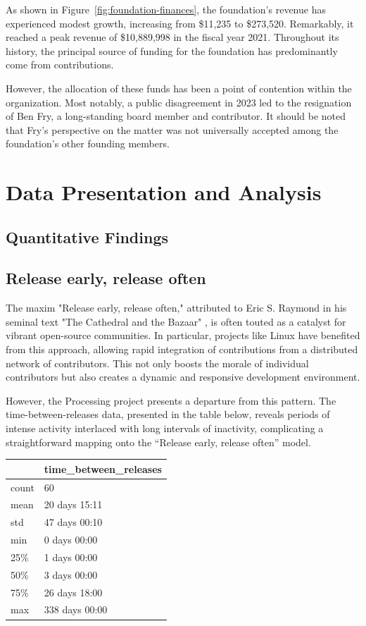\documentclass[draft]{article}
\begin{document}
As shown in Figure~\ref{fig:foundation-finances}, the foundation's revenue has experienced modest growth, increasing from \$11,235 to \$273,520. Remarkably, it reached a peak revenue of \$10,889,998 in the fiscal year 2021. Throughout its history, the principal source of funding for the foundation has predominantly come from contributions. 

However, the allocation of these funds has been a point of contention within the organization. Most notably, a public disagreement in 2023 led to the resignation of Ben Fry, a long-standing board member and contributor. It should be noted that Fry's perspective on the matter was not universally accepted among the foundation's other founding members. \parencite{benfry[@ben_fry]HaveMadeExtremely2023} \parencite{caseyreas[@reas]EarlierThisWeek2023} \parencite{danielshiffman[@shiffman]WouldPostNote2023}

\section{Data Presentation and Analysis}

\subsection{Quantitative Findings}

\subsection{Release early, release often}

The maxim "Release early, release often," attributed to Eric S. Raymond in his seminal text "The Cathedral and the Bazaar" \parencite{raymondCathedralBazaar1999}, is often touted as a catalyst for vibrant open-source communities. In particular, projects like Linux have benefited from this approach, allowing rapid integration of contributions from a distributed network of contributors. This not only boosts the morale of individual contributors but also creates a dynamic and responsive development environment.

However, the Processing project presents a departure from this pattern. The time-between-releases data, presented in the table below, reveals periods of intense activity interlaced with long intervals of inactivity, complicating a straightforward mapping onto the “Release early, release often” model.

\begin{tabular}{ll}
  \toprule
   & time\_between\_releases \\
  \midrule
  count & 60 \\
  mean & 20 days 15:11 \\
  std & 47 days 00:10 \\
  min & 0 days 00:00 \\
  25\% & 1 days 00:00 \\
  50\% & 3 days 00:00 \\
  75\% & 26 days 18:00 \\
  max & 338 days 00:00 \\
  \bottomrule
\end{tabular}
\end{document}
